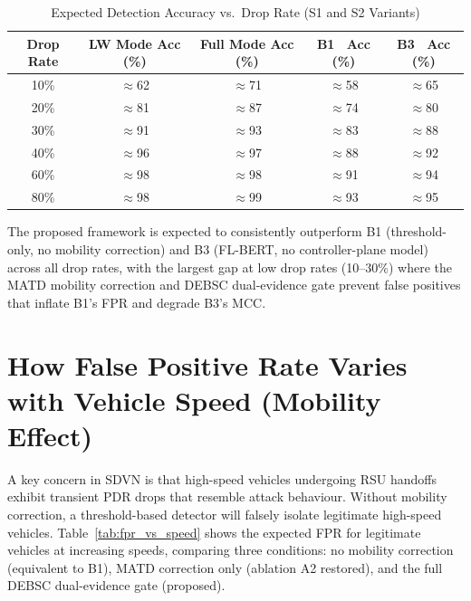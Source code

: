 \documentclass[12pt, a4paper]{report}
\begin{document}
\begin{table}[htbp]
\renewcommand{\arraystretch}{1.3}
\caption{Expected Detection Accuracy vs.\ Drop Rate (S1 and S2 Variants)}
\label{tab:acc_vs_intensity}
\centering
\scriptsize
\begin{tabular}{|c|c|c|c|c|}
\hline
\textbf{Drop Rate} &
\textbf{LW Mode Acc (\%)} &
\textbf{Full Mode Acc (\%)} &
\textbf{B1~\cite{malik2023greyhole} Acc (\%)} &
\textbf{B3~\cite{ahsan2024flbert} Acc (\%)} \\
\hline
10\% & $\approx$62 & $\approx$71 & $\approx$58 & $\approx$65 \\
20\% & $\approx$81 & $\approx$87 & $\approx$74 & $\approx$80 \\
30\% & $\approx$91 & $\approx$93 & $\approx$83 & $\approx$88 \\
40\% & $\approx$96 & $\approx$97 & $\approx$88 & $\approx$92 \\
60\% & $\approx$98 & $\approx$98 & $\approx$91 & $\approx$94 \\
80\% & $\approx$98 & $\approx$99 & $\approx$93 & $\approx$95 \\
\hline
\end{tabular}
\end{table}

The proposed framework is expected to consistently outperform B1 (threshold-only,
no mobility correction) and B3 (FL-BERT, no controller-plane model) across all
drop rates, with the largest gap at low drop rates (10--30\%) where the
MATD mobility correction and DEBSC dual-evidence gate prevent false
positives that inflate B1's FPR and degrade B3's MCC.

\section{How False Positive Rate Varies with Vehicle Speed (Mobility Effect)}

A key concern in SDVN is that high-speed vehicles undergoing RSU handoffs
exhibit transient PDR drops that resemble attack behaviour. Without mobility
correction, a threshold-based detector will falsely isolate legitimate
high-speed vehicles. Table~\ref{tab:fpr_vs_speed} shows the expected FPR
for legitimate vehicles at increasing speeds, comparing three conditions:
no mobility correction (equivalent to B1), MATD correction only (ablation A2
restored), and the full DEBSC dual-evidence gate (proposed).
\end{document}

